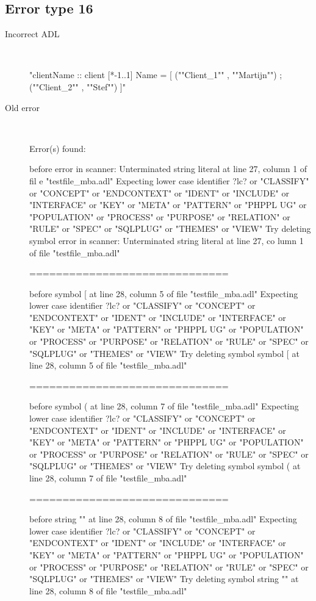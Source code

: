\hrulefill

\subsection{Error type 16}
  \begin{description}
  \item[Incorrect ADL]~\\
\begin{adl}
"clientName :: client [*-1..1] Name =
    [ (""Client_1""      , ""Martijn"")
    ; (""Client_2""      , ""Stef"")
    ]"\end{adl}
  \item[Old error]~\\
\begin{haskell}
Error(s) found:

before error in scanner: Unterminated string literal at line 27, column 1 of fil
e "testfile_mba.adl"
Expecting lower case identifier ?lc? or "CLASSIFY" or "CONCEPT" or "ENDCONTEXT"
or "IDENT" or "INCLUDE" or "INTERFACE" or "KEY" or "META" or "PATTERN" or "PHPPL
UG" or "POPULATION" or "PROCESS" or "PURPOSE" or "RELATION" or "RULE" or "SPEC"
or "SQLPLUG" or "THEMES" or "VIEW"
Try deleting symbol error in scanner: Unterminated string literal at line 27, co
lumn 1 of file "testfile_mba.adl"

==============================

before symbol [ at line 28, column 5 of file "testfile_mba.adl"
Expecting lower case identifier ?lc? or "CLASSIFY" or "CONCEPT" or "ENDCONTEXT"
or "IDENT" or "INCLUDE" or "INTERFACE" or "KEY" or "META" or "PATTERN" or "PHPPL
UG" or "POPULATION" or "PROCESS" or "PURPOSE" or "RELATION" or "RULE" or "SPEC"
or "SQLPLUG" or "THEMES" or "VIEW"
Try deleting symbol symbol [ at line 28, column 5 of file "testfile_mba.adl"

==============================

before symbol ( at line 28, column 7 of file "testfile_mba.adl"
Expecting lower case identifier ?lc? or "CLASSIFY" or "CONCEPT" or "ENDCONTEXT"
or "IDENT" or "INCLUDE" or "INTERFACE" or "KEY" or "META" or "PATTERN" or "PHPPL
UG" or "POPULATION" or "PROCESS" or "PURPOSE" or "RELATION" or "RULE" or "SPEC"
or "SQLPLUG" or "THEMES" or "VIEW"
Try deleting symbol symbol ( at line 28, column 7 of file "testfile_mba.adl"

==============================

before string "" at line 28, column 8 of file "testfile_mba.adl"
Expecting lower case identifier ?lc? or "CLASSIFY" or "CONCEPT" or "ENDCONTEXT"
or "IDENT" or "INCLUDE" or "INTERFACE" or "KEY" or "META" or "PATTERN" or "PHPPL
UG" or "POPULATION" or "PROCESS" or "PURPOSE" or "RELATION" or "RULE" or "SPEC"
or "SQLPLUG" or "THEMES" or "VIEW"
Try deleting symbol string "" at line 28, column 8 of file "testfile_mba.adl"


\end{haskell}
\end{description}
